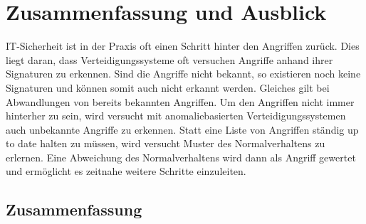 \chapter{Zusammenfassung und Ausblick}

IT-Sicherheit ist in der Praxis oft einen Schritt hinter den Angriffen zurück.
Dies liegt daran, dass Verteidigungssysteme oft versuchen Angriffe anhand ihrer Signaturen zu erkennen.
Sind die  Angriffe nicht bekannt, so existieren noch keine Signaturen und können somit auch nicht erkannt werden.
Gleiches gilt bei Abwandlungen von bereits bekannten Angriffen.
Um den Angriffen nicht immer hinterher zu sein, wird versucht mit anomaliebasierten Verteidigungssystemen auch unbekannte Angriffe zu erkennen.
Statt eine Liste von Angriffen ständig up to date halten zu müssen, wird versucht Muster des Normalverhaltens zu erlernen.
Eine Abweichung des Normalverhaltens wird dann als Angriff gewertet und ermöglicht es zeitnahe weitere Schritte einzuleiten.

\section{Zusammenfassung}

